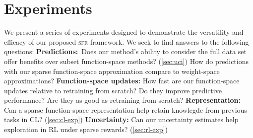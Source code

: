 \documentclass{article}
\newcommand{\our}{\textsc{sfr}\xspace}
\begin{document}
\section{Experiments}
\label{sec:experiments}
%
We present a series of experiments designed to demonstrate the versatility and efficacy of our proposed \our framework. We seek to find answers to the following questions: 
\textbf{Predictions:}~Does our method's ability to consider the full data set offer benefits over subset function-space methods? (\cref{sec:uci}) How do predictions with our sparse function-space approximation compare to weight-space approximations? 
\textbf{Function-space updates:} How fast are our function-space updates relative to retraining from scratch? Do they improve predictive performance? Are they as good as retraining from scratch? 
\textbf{Representation:} Can a sparse function-space representation help retain knowlegde from previous tasks in CL? (\cref{sec:cl-exp})
\textbf{Uncertainty:} Can our uncertainty estimates help exploration in RL under sparse rewards? (\cref{sec:rl-exp})


%
\end{document}
